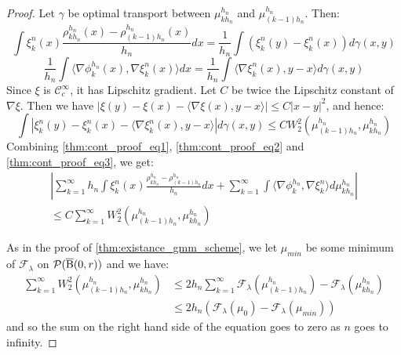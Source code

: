 \begin{proof}
Let $\gamma$ be optimal transport between $\mu_{kh_n}^{h_n}$ and $\mu_{(k-1)h_n}^{h_n}$. Then:
\begin{equation} \label{thm:cont_proof_eq1}
\int \xi_k^n(x) \frac{\rho_{kh_n}^{h_n}(x) - \rho_{(k-1)h_n}^{h_n}(x)}{h_n} dx = \frac{1}{h_n} \int (\xi_k^n(y) - \xi_k^n(x)) d\gamma(x,y)
\end{equation}
\begin{equation} \label{thm:cont_proof_eq2}
\frac{1}{h_n}\int \langle \nabla \phi_k^{h_n}(x) , \nabla \xi_k^n(x) \rangle dx = \frac{1}{h_n} \int \langle \nabla \xi_k^n(x), y-x \rangle d\gamma(x,y) 
\end{equation}
Since $\xi$ is $\mathcal{C}_c^{\infty}$, it has Lipschitz gradient. Let $C$ be twice the Lipschitz constant of $\nabla \xi$. Then we have $| \xi(y) - \xi(x) - \langle \nabla \xi(x), y-x \rangle | \leq C|x- y|^2$, and hence:
\begin{equation} \label{thm:cont_proof_eq3}
\int |\xi_k^n(y) - \xi_k^n(x) - \langle \nabla \xi_k^n(x), y-x \rangle | d \gamma(x,y) \leq CW_2^2( \mu_{(k-1)h_n}^{h_n}, \mu_{kh_n}^{h_n})
\end{equation}
Combining \ref{thm:cont_proof_eq1}, \ref{thm:cont_proof_eq2} and \ref{thm:cont_proof_eq3}, we get:
\begin{multline} \label{thm:cont_proof_eq4}
\left|\sum_{k=1}^{\infty} h_n \int \xi_k^n(x) \frac{\rho_{kh_n}^{h_n} - \rho_{(k-1)h_n}^{h_n}}{h_n} dx  + 
\sum_{k=1}^{\infty} \int \langle \nabla \phi_k^{h_n} , \nabla \xi_k^n \rangle d\mu_{kh_n}^{h_n} \right| \\
\leq C\sum_{k=1}^{\infty} W_2^2(\mu_{(k-1)h_n}^{h_n}, \mu_{kh_n}^{h_n})
\end{multline}

As in the proof of \ref{thm:existance_gmm_scheme}, we let $\mu_{min}$ be some minimum of $\mathcal{F}_{\lambda}$ on $\mathcal{P}(\operatorname{\overline{B}}(0,r))$ and we have:
\begin{equation} \label{thm:cont_proof_eq5}
\begin{aligned}
\sum_{k=1}^{\infty} W_2^2(\mu_{(k-1)h_n}^{h_n}, \mu_{kh_n}^{h_n}) & \leq  2 h_n \sum_{k=1}^{\infty} \mathcal{F}_{\lambda}(\mu_{(k-1)h_n}^{h_n}) - \mathcal{F}_{\lambda}(\mu_{kh_n}^{h_n}) \\ & \leq 2h_n \left(\mathcal{F}_{\lambda}(\mu_0) - \mathcal{F}_{\lambda}(\mu_{min}) \right)
\end{aligned}
\end{equation}
and so the sum on the right hand side of the equation goes to zero as $n$ goes to infinity.


\end{proof}
